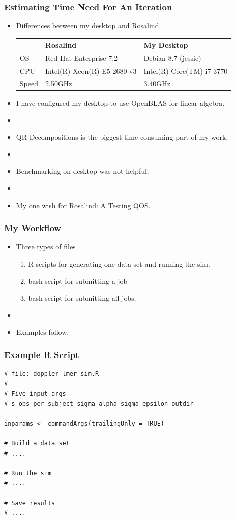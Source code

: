 \documentclass[10pt]{beamer}
\begin{document}
\begin{frame}
  \frametitle{Estimating Time Need For An Iteration}
  \small
  \vspace{-0.2in}
  \begin{itemize}
    \item Differences between my desktop and Rosalind
      \begin{tabular}{p{0.75in}ll}
            & Rosalind                                  & My Desktop \\ \hline
        OS  & Red Hat Enterprise 7.2                    & Debian 8.7 (jessie) \\
        CPU & Intel(R) Xeon(R) E5-2680 v3 & Intel(R) Core(TM) i7-3770 \\
        Speed & 2.50GHz & 3.40GHz \\ \hline
      \end{tabular} 

    \item I have configured my desktop to use OpenBLAS for linear algebra.
    \item[]
    \item QR Decompositions is the biggest time consuming part of my work.
    \item[]
    \item Benchmarking on desktop was not helpful.
    \item[]
    \item My one wish for Rosalind: A Testing QOS.
  \end{itemize}
\end{frame}

\begin{frame}[fragile]
  \frametitle{My Workflow}
  \begin{itemize}
    \item Three types of files
      \begin{enumerate}
        \item R scripts for generating one data set and running the sim.
        \item bash script for submitting a job
        \item bash script for submitting all jobs.
      \end{enumerate}
    \item[]
    \item Examples follow.
  \end{itemize}
\end{frame}

\begin{frame}[fragile]
  \frametitle{Example R Script}
  \small
  \vspace{-0.2in}
  \begin{verbatim}
# file: doppler-lmer-sim.R
# 
# Five input args 
# s obs_per_subject sigma_alpha sigma_epsilon outdir

inparams <- commandArgs(trailingOnly = TRUE)

# Build a data set
# ....

# Run the sim
# ....

# Save results 
# ....
\end{verbatim}
\end{frame}
\end{document}
